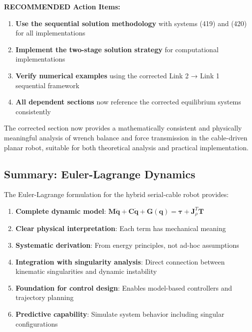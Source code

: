 \textbf{RECOMMENDED Action Items:}
\begin{enumerate}
    \item \textbf{Use the sequential solution methodology} with systems (419) and (420) for all implementations
    \item \textbf{Implement the two-stage solution strategy} for computational implementations
    \item \textbf{Verify numerical examples} using the corrected Link 2 → Link 1 sequential framework
    \item \textbf{All dependent sections} now reference the corrected equilibrium systems consistently
\end{enumerate}

The corrected section now provides a mathematically consistent and physically meaningful analysis of wrench balance and force transmission in the cable-driven planar robot, suitable for both theoretical analysis and practical implementation.

\subsection{Summary: Euler-Lagrange Dynamics}

The Euler-Lagrange formulation for the hybrid serial-cable robot provides:

\begin{enumerate}
    \item \textbf{Complete dynamic model}: $\mathbf{M} \ddot{\mathbf{q}} + \mathbf{C} \dot{\mathbf{q}} + \mathbf{G}(\mathbf{q}) = \boldsymbol{\tau} + \mathbf{J}_{\rho}^T \mathbf{T}$
    
    \item \textbf{Clear physical interpretation}: Each term has mechanical meaning
    
    \item \textbf{Systematic derivation}: From energy principles, not ad-hoc assumptions
    
    \item \textbf{Integration with singularity analysis}: Direct connection between kinematic singularities and dynamic instability
    
    \item \textbf{Foundation for control design}: Enables model-based controllers and trajectory planning
    
    \item \textbf{Predictive capability}: Simulate system behavior including singular configurations
\end{enumerate}
